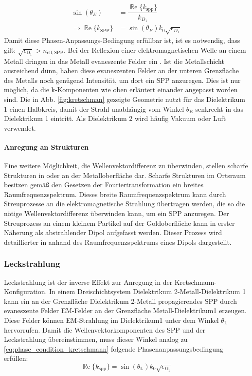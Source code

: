 \documentclass[titlepage]{article}
\renewcommand{\Re}{\operatorname{\mathbb{R}e}}
\begin{document}
	\begin{align}
		\label{eq:phase_condition_kretschmann}
		\sin(\theta_E) &= \dfrac{\Re\{k_{\mathrm{spp}}\}}{k_{D_1}}\\
		\Rightarrow \Re\{k_{\mathrm{SPP}}\} &= \sin(\theta_E) k_0 \sqrt{\epsilon_{D_1}}
	\end{align}
	Damit diese Phasen-Anpassungs-Bedingung erfüllbar ist, ist es notwendig, dass gilt: $\sqrt{\epsilon_\mathrm{D_1}} > n_\mathrm{eff, SPP}$.
	Bei der Reflexion einer elektromagnetischen Welle an einem Metall dringen in das Metall evaneszente Felder ein \cite{Novotny.2012b}. Ist die Metallschicht ausreichend dünn, haben diese evaneszenten Felder an der unteren Grenzfläche des Metalls noch genügend Intensität, um dort ein SPP anzuregen. Dies ist nur möglich, da die k-Komponenten wie oben erläutert einander angepasst worden sind. Die in Abb. \ref{fig:kretschman} gezeigte Geometrie nutzt für das Dielektrikum 1 einen Halbkreis, damit der Strahl unabhängig vom Winkel $\theta_\mathrm{E}$ senkrecht in das Dielektrikum 1 eintritt. Als Dielektrikum 2 wird häufig Vakuum oder Luft verwendet.			
	
	\paragraph{Anregung an Strukturen}
	Eine weitere Möglichkeit, die Wellenvektordifferenz zu überwinden, stellen scharfe Strukturen in oder an der Metalloberfläche dar. Scharfe Strukturen im Ortsraum besitzen gemäß den Gesetzen der Fouriertransformation ein breites Raumfrequenzspektrum. Dieses breite Raumfrequenzspektrum kann durch Streuprozesse an die elektromagnetische Strahlung übertragen werden, die so die nötige Wellenvektordifferenz überwinden kann, um ein SPP anzuregen. Der Streuprozess an einem kleinem Partikel auf der Goldoberfläche kann in erster Näherung als abstrahlender Dipol aufgefasst werden. Dieser Prozess wird detaillierter in  anhand des Raumfrequenzspektrums eines Dipols dargestellt.
	\subsubsection{Leckstrahlung}
	\label{sec:leakage_radiation}
	Leckstrahlung ist der inverse Effekt zur Anregung in der Kretschmann-Konfiguration. In einem Dreischichtsystem Dielektrikum 2-Metall-Dielektrikum 1 kann ein an der Grenzfläche Dielektrikum 2-Metall propagierendes SPP durch evaneszente Felder EM-Felder an der Grenzfläche Metall-Dielektrikum1 erzeugen. Diese Felder können EM-Strahlung im Dielektrikum1 unter dem Winkel $\theta_\mathrm{L}$ hervorrufen. Damit die Wellenvektorkomponenten des SPP und der Leckstrahlung übereinstimmen, muss dieser Winkel analog zu \eqref{eq:phase_condition_kretschmann} folgende Phasenanpassungsbedingung erfüllen:
	\begin{equation}
		\label{eq:phase_condition}
		\boxed{\Re\{k_{\mathrm{spp}}\}=\sin(\theta_\mathrm{L}) k_0 \sqrt{\epsilon_{D_1}}}
	\end{equation}
	
\end{document}
